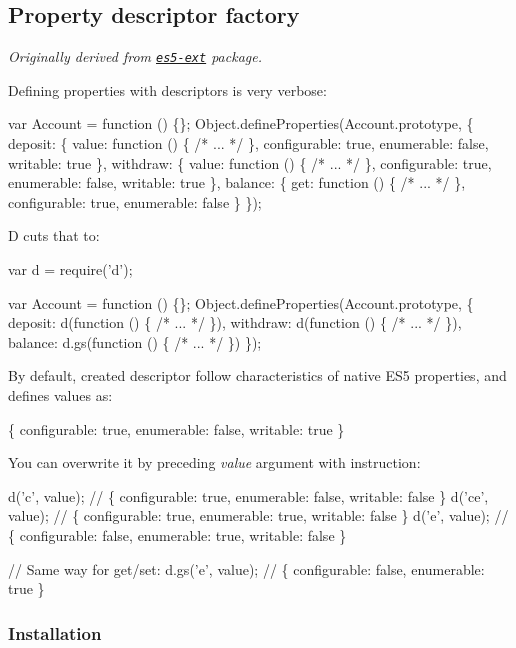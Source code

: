 \subsection*{Property descriptor factory}

{\itshape Originally derived from \href{https://github.com/medikoo/es5-ext}{\tt es5-\/ext} package.}

Defining properties with descriptors is very verbose\+:


\begin{DoxyCode}
var Account = function () \{\};
Object.defineProperties(Account.prototype, \{
  deposit: \{ value: function () \{
      /* ... */
    \}, configurable: true, enumerable: false, writable: true \},
  withdraw: \{ value: function () \{
      /* ... */
    \}, configurable: true, enumerable: false, writable: true \},
  balance: \{ get: function () \{
      /* ... */
    \}, configurable: true, enumerable: false \}
\});
\end{DoxyCode}


D cuts that to\+:


\begin{DoxyCode}
var d = require('d');

var Account = function () \{\};
Object.defineProperties(Account.prototype, \{
  deposit: d(function () \{
    /* ... */
  \}),
  withdraw: d(function () \{
    /* ... */
  \}),
  balance: d.gs(function () \{
    /* ... */
  \})
\});
\end{DoxyCode}


By default, created descriptor follow characteristics of native E\+S5 properties, and defines values as\+:


\begin{DoxyCode}
\{ configurable: true, enumerable: false, writable: true \}
\end{DoxyCode}


You can overwrite it by preceding {\itshape value} argument with instruction\+: 
\begin{DoxyCode}
d('c', value); // \{ configurable: true, enumerable: false, writable: false \}
d('ce', value); // \{ configurable: true, enumerable: true, writable: false \}
d('e', value); // \{ configurable: false, enumerable: true, writable: false \}

// Same way for get/set:
d.gs('e', value); // \{ configurable: false, enumerable: true \}
\end{DoxyCode}


\subsubsection*{Installation}

